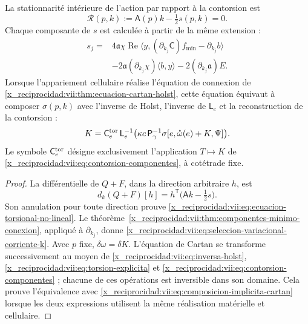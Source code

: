 \begin{proposition}
\label{x_reciprocidad:vii:prop:ecuacion-torsional-no-lineal}
La stationnarité intérieure de l'action par rapport à la contorsion est
\begin{equation}
 \mathcal R(p,k):=\mathsf A(p)k-\tfrac12s(p,k)=0.
 \label{x_reciprocidad:vii:eq:ecuacion-torsional-no-lineal}
\end{equation}
Chaque composante de \(s\) est calculée à partir de la même extension :
\begin{equation}
 \begin{split}
 s_j={}&4\mathfrak a\chi\operatorname{Re}
       \langle y,(\partial_{k_j}\mathsf C)f_{\min}
                         -\partial_{k_j}b\rangle\\
 &-2\mathfrak a(\partial_{k_j}\chi)\langle b,y\rangle
       -2(\partial_{k_j}\mathfrak a)E.
 \end{split}
 \label{x_reciprocidad:vii:eq:seleccion-variacional-corriente-k}
\end{equation}
Lorsque l'appariement cellulaire réalise l'équation de connexion de
\ref{x_reciprocidad:vii:thm:ecuacion-cartan-holst}, cette équation équivaut à composer
\(\sigma(p,k)\) avec l'inverse de Holst, l'inverse de
\(\mathsf L_e\) et la reconstruction de la contorsion :
\begin{equation}
 K=\mathsf C_e^{\rm tor}\,\mathsf L_e^{-1}
           \bigl(\kappa c\,\mathsf P_\gamma^{-1}
             \sigma[e,\mathring\omega(e)+K,\Psi]\bigr).
 \label{x_reciprocidad:vii:eq:composicion-implicita-cartan}
\end{equation}
Le symbole \(\mathsf C_e^{\rm tor}\) désigne exclusivement l'application \(T\mapsto K\) de \eqref{x_reciprocidad:vii:eq:contorsion-componentes}, à cotétrade fixe.
\end{proposition}

\begin{proof}
La différentielle de \(Q+F\), dans la direction arbitraire \(h\), est
\[
 d_k(Q+F)[h]
   =h^{\mathsf T}\bigl(\mathsf A k-\tfrac12s\bigr).
\]
Son annulation pour toute direction prouve \eqref{x_reciprocidad:vii:eq:ecuacion-torsional-no-lineal}. Le théorème~\ref{x_reciprocidad:vii:thm:componentes-minimo-conexion}, appliqué à \(\partial_{k_j}\), donne \eqref{x_reciprocidad:vii:eq:seleccion-variacional-corriente-k}. Avec \(p\) fixe, \(\delta\omega=\delta K\). L'équation de Cartan se transforme successivement au moyen de \eqref{x_reciprocidad:vii:eq:inversa-holst}, \eqref{x_reciprocidad:vii:eq:torsion-explicita} et \eqref{x_reciprocidad:vii:eq:contorsion-componentes} ; chacune de ces opérations est inversible dans son domaine. Cela prouve l'équivalence avec \eqref{x_reciprocidad:vii:eq:composicion-implicita-cartan} lorsque les deux expressions utilisent la même réalisation matérielle et cellulaire.
\end{proof}


